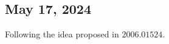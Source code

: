 \begin{center}
\section*{\creationmonth}
\end{center}

\subsection*{May 17, 2024}
Following the idea proposed in $2006.01524$. 
